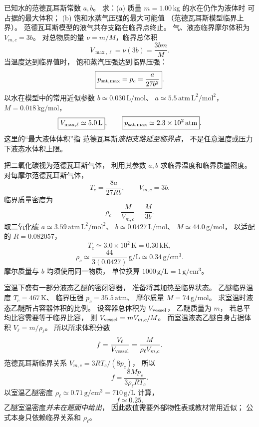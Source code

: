 已知水的范德瓦耳斯常数 $a,b$。
求：(a) 质量
$m=1.00\,\mathrm{kg}$ 的水在仍作为液体时
可占据的最大体积；
(b) 饱和水蒸气压强的最大可能值
（范德瓦耳斯模型临界上界）。
\exsolution
范德瓦耳斯模型的液气共存支路在临界点终止。
气、液态临界摩尔体积为
$V_{m,c}=3b$。
对总物质的量
$\nu=m/M$，临界总体积
\[
\boxed{V_{\max,\ell}=\nu(3b)=\frac{3bm}{M}}.
\]
当温度达到临界值时，
饱和蒸汽压强达到临界压强：
\[
\boxed{p_{\rm sat,max}=p_c=\frac a{27b^2}}.
\]
以水在模型中的常用近似参数
$b\simeq0.030\,\mathrm{L/mol}$、
$a\simeq5.5\,\mathrm{atm\,L^2/mol^2}$，
$M=0.018\,\mathrm{kg/mol}$，
\[
\boxed{V_{\max,\ell}\simeq5.0\,\mathrm L},\qquad
\boxed{p_{\rm sat,max}\simeq2.3\times10^2\,\mathrm{atm}}.
\]
\excheck 这里的“最大液体体积”指
范德瓦耳斯\emph{液相支路延至临界点}，
不是任意温度或压力下液态水体积上限。

把二氧化碳视为范德瓦耳斯气体，
利用其参数 $a,b$ 求临界温度和临界质量密度。
\exsolution
对每摩尔范德瓦耳斯气体，
\[
T_c=\frac{8a}{27Rb},\qquad V_{m,c}=3b.
\]
临界质量密度为
\[
\boxed{\rho_c=\frac M{V_{m,c}}=\frac M{3b}}.
\]
取二氧化碳
$a\simeq3.59\,\mathrm{atm\,L^2/mol^2}$、
$b\simeq0.0427\,\mathrm{L/mol}$、
$M\simeq44.0\,\mathrm{g/mol}$，
以适配的 $R=0.082057$，
\[
\boxed{T_c\simeq3.0\times10^2\,\mathrm K
=0.30\,\mathrm{kK}},
\]
\[
\boxed{\rho_c\simeq\frac{44}{3(0.0427)}
\,\mathrm{g/L}\simeq0.34\,\mathrm{g/cm^3}}.
\]
\excheck 摩尔质量与 $b$ 均须使用同一物质，
单位换算
$1000\,\mathrm{g/L}=1\,\mathrm{g/cm^3}$。

室温下盛有一部分液态乙醚的密闭容器，
准备将其加热至临界状态。
乙醚临界温度
$T_c=467\,\mathrm K$、
临界压强
$p_c=35.5\,\mathrm{atm}$、
摩尔质量
$M=74\,\mathrm{g/mol}$。
求室温时液态乙醚所占容器体积的比例。
\exsolution
设容器总体积为 $V_{\rm vessel}$，
乙醚质量为 $m$，
若总平均比容需要等于临界比容，
则
$V_{\rm vessel}=mV_{m,c}/M$。
而室温液态乙醚自身占据体积
$V_\ell=m/\rho_\ell$。
所以所求体积分数
\[
f=\frac{V_\ell}{V_{\rm vessel}}
=\frac M{\rho_\ell V_{m,c}}.
\]
范德瓦耳斯临界关系
$V_{m,c}=3RT_c/(8p_c)$，
所以
\[
\boxed{f=\frac{8Mp_c}{3\rho_\ell RT_c}}.
\]
以室温乙醚密度
$\rho_\ell\simeq0.71\,\mathrm{g/cm^3}
=710\,\mathrm{g/L}$ 计算，
\[
\boxed{f\simeq0.25}.
\]
\excheck 乙醚室温密度\emph{并未在题面中给出}，
因此数值需要外部物性表或教材常用近似；
公式本身只依赖临界关系和 $\rho_\ell$。

